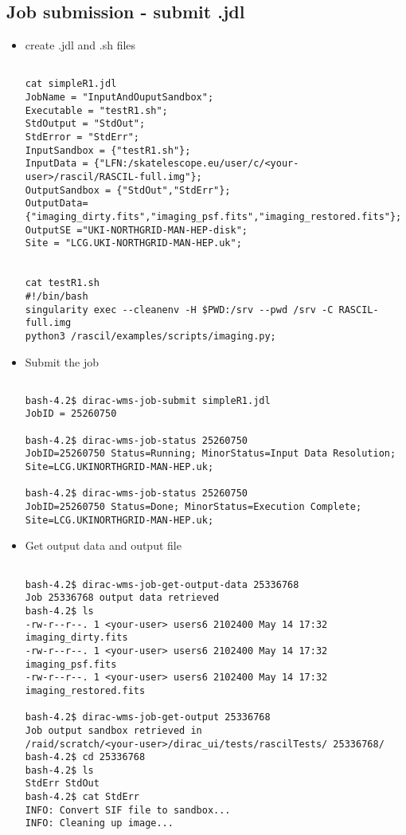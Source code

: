 \documentclass[english]{article}
\begin{document}
\subsection{Job submission - submit .jdl }
\begin{itemize}
    \item create .jdl and .sh files

  \begin{verbatim}

cat simpleR1.jdl
JobName = "InputAndOuputSandbox";
Executable = "testR1.sh";
StdOutput = "StdOut";
StdError = "StdErr";
InputSandbox = {"testR1.sh"};
InputData = {"LFN:/skatelescope.eu/user/c/<your-user>/rascil/RASCIL-full.img"};
OutputSandbox = {"StdOut","StdErr"};
OutputData={"imaging_dirty.fits","imaging_psf.fits","imaging_restored.fits"};
OutputSE ="UKI-NORTHGRID-MAN-HEP-disk";
Site = "LCG.UKI-NORTHGRID-MAN-HEP.uk";


cat testR1.sh
#!/bin/bash
singularity exec --cleanenv -H $PWD:/srv --pwd /srv -C RASCIL-full.img
python3 /rascil/examples/scripts/imaging.py;

\end{verbatim}

\item Submit the job
\begin{verbatim}

bash-4.2$ dirac-wms-job-submit simpleR1.jdl
JobID = 25260750

bash-4.2$ dirac-wms-job-status 25260750
JobID=25260750 Status=Running; MinorStatus=Input Data Resolution; 
Site=LCG.UKINORTHGRID-MAN-HEP.uk;

bash-4.2$ dirac-wms-job-status 25260750
JobID=25260750 Status=Done; MinorStatus=Execution Complete; 
Site=LCG.UKINORTHGRID-MAN-HEP.uk;
\end{verbatim}

\item Get output data and output file
\begin{verbatim}

bash-4.2$ dirac-wms-job-get-output-data 25336768
Job 25336768 output data retrieved
bash-4.2$ ls
-rw-r--r--. 1 <your-user> users6 2102400 May 14 17:32 imaging_dirty.fits
-rw-r--r--. 1 <your-user> users6 2102400 May 14 17:32 imaging_psf.fits
-rw-r--r--. 1 <your-user> users6 2102400 May 14 17:32 imaging_restored.fits

bash-4.2$ dirac-wms-job-get-output 25336768
Job output sandbox retrieved in
/raid/scratch/<your-user>/dirac_ui/tests/rascilTests/ 25336768/
bash-4.2$ cd 25336768
bash-4.2$ ls
StdErr StdOut
bash-4.2$ cat StdErr
INFO: Convert SIF file to sandbox...
INFO: Cleaning up image...

\end{verbatim}

\end{itemize}
\end{document}
